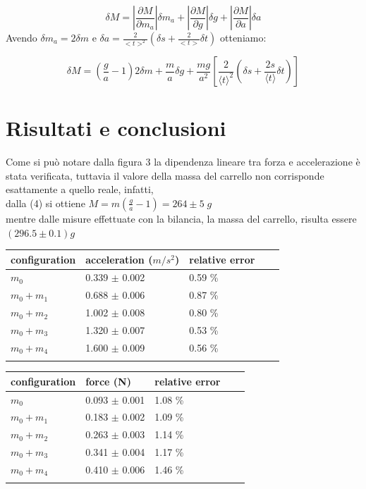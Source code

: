 \documentclass[11pt,a4paper]{article}
\begin{document}
\begin{equation}
    \delta M = \left| \frac{\partial M}{\partial m_a} \right| \delta m_a + \left| \frac{\partial M}{\partial g} \right| \delta g + \left| \frac{\partial M}{\partial a} \right| \delta a
\end{equation}
Avendo $\delta m_a=2\delta m$ e $\delta a=\frac{2}{<t>^2}\left(\delta s + \frac{2}{<t>}\delta t \right)$ otteniamo:

\begin{equation}
    \delta M = \left( \frac{g}{a} -1 \right)2 \delta m + \frac{m}{a} \delta g + \frac{mg}{a^2}  \left [ \frac{2}{\langle t \rangle^2} \left( \delta s + \frac{2s}{\langle t \rangle}\delta t \right)\right]
\end{equation}

\section{Risultati e conclusioni}
 Come si può notare dalla figura 3 la dipendenza lineare tra forza e accelerazione è stata verificata, tuttavia il valore della massa del carrello non corrisponde esattamente a quello reale, infatti, \\dalla (4) si ottiene $M=m\left(\frac{g}{a}-1 \right) = 264 \pm 5 \; g $ \\mentre dalle misure effettuate con la bilancia, la massa del carrello, risulta essere $(296.5 \pm 0.1)g$
 
\begin{longtable}[]{@{}lllll@{}}
\toprule
configuration & acceleration ($m/s^2$) & relative error \tabularnewline
\midrule
\endhead
$m_0$ & 0.339 $\pm$ 0.002 & 0.59 \% \tabularnewline
$m_0+m_1$ & 0.688 $\pm$ 0.006 & 0.87 \% \tabularnewline
$m_0+m_2$ & 1.002 $\pm$ 0.008 & 0.80 \% \tabularnewline
$m_0+m_3$ & 1.320 $\pm$ 0.007 & 0.53 \% \tabularnewline
$m_0+m_4$ & 1.600 $\pm$ 0.009 & 0.56 \% \tabularnewline
\bottomrule
\label{output1}
\end{longtable}

\begin{longtable}[]{@{}lllll@{}}
\toprule
configuration & force (N) & relative error \tabularnewline
\midrule
\endhead
$m_0$ & 0.093 $\pm$ 0.001 & 1.08 \% \tabularnewline
$m_0+m_1$ & 0.183 $\pm$ 0.002 & 1.09 \% \tabularnewline
$m_0+m_2$ & 0.263 $\pm$ 0.003 & 1.14 \% \tabularnewline
$m_0+m_3$ & 0.341 $\pm$ 0.004 & 1.17 \% \tabularnewline
$m_0+m_4$ & 0.410 $\pm$ 0.006 & 1.46 \% \tabularnewline
\bottomrule
\label{output2}
\end{longtable}
\end{document}
